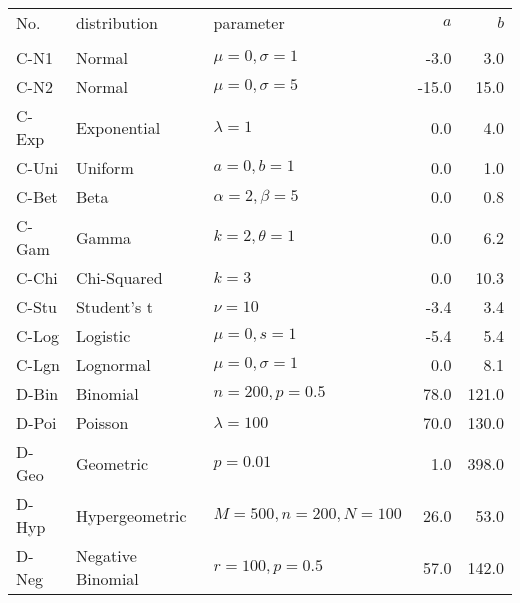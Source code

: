 \begin{tabular}{lllrr}
\toprule
No. & distribution & parameter & $a$ & $b$ \\
 &  &  &  &  \\
\midrule
C-N1 & Normal & $\mu=0, \sigma=1$ & -3.0 & 3.0 \\
C-N2 & Normal & $\mu=0, \sigma=5$ & -15.0 & 15.0 \\
C-Exp & Exponential & $\lambda=1$ & 0.0 & 4.0 \\
C-Uni & Uniform & $a=0, b=1$ & 0.0 & 1.0 \\
C-Bet & Beta & $\alpha=2, \beta=5$ & 0.0 & 0.8 \\
C-Gam & Gamma & $k=2, \theta=1$ & 0.0 & 6.2 \\
C-Chi & Chi-Squared & $k=3$ & 0.0 & 10.3 \\
C-Stu & Student's t & $\nu=10$ & -3.4 & 3.4 \\
C-Log & Logistic & $\mu=0, s=1$ & -5.4 & 5.4 \\
C-Lgn & Lognormal & $\mu=0, \sigma=1$ & 0.0 & 8.1 \\
D-Bin & Binomial & $n=200, p=0.5$ & 78.0 & 121.0 \\
D-Poi & Poisson & $\lambda=100$ & 70.0 & 130.0 \\
D-Geo & Geometric & $p=0.01$ & 1.0 & 398.0 \\
D-Hyp & Hypergeometric & $M=500, n=200, N=100$ & 26.0 & 53.0 \\
D-Neg & Negative Binomial & $r=100, p=0.5$ & 57.0 & 142.0 \\
\bottomrule
\end{tabular}
